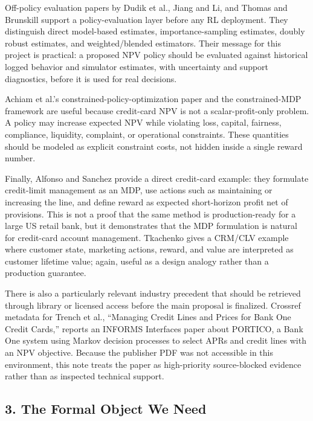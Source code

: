 \documentclass[
]{article}
\begin{document}
Off-policy evaluation papers by Dudik et al., Jiang and Li, and Thomas
and Brunskill support a policy-evaluation layer before any RL
deployment. They distinguish direct model-based estimates,
importance-sampling estimates, doubly robust estimates, and
weighted/blended estimators. Their message for this project is
practical: a proposed NPV policy should be evaluated against historical
logged behavior and simulator estimates, with uncertainty and support
diagnostics, before it is used for real decisions.

Achiam et al.'s constrained-policy-optimization paper and the
constrained-MDP framework are useful because credit-card NPV is not a
scalar-profit-only problem. A policy may increase expected NPV while
violating loss, capital, fairness, compliance, liquidity, complaint, or
operational constraints. These quantities should be modeled as explicit
constraint costs, not hidden inside a single reward number.

Finally, Alfonso and Sanchez provide a direct credit-card example: they
formulate credit-limit management as an MDP, use actions such as
maintaining or increasing the line, and define reward as expected
short-horizon profit net of provisions. This is not a proof that the
same method is production-ready for a large US retail bank, but it
demonstrates that the MDP formulation is natural for credit-card account
management. Tkachenko gives a CRM/CLV example where customer state,
marketing actions, reward, and value are interpreted as customer
lifetime value; again, useful as a design analogy rather than a
production guarantee.

There is also a particularly relevant industry precedent that should be
retrieved through library or licensed access before the main proposal is
finalized. Crossref metadata for Trench et al., ``Managing Credit Lines
and Prices for Bank One Credit Cards,'' reports an INFORMS Interfaces
paper about PORTICO, a Bank One system using Markov decision processes
to select APRs and credit lines with an NPV objective. Because the
publisher PDF was not accessible in this environment, this note treats
the paper as high-priority source-blocked evidence rather than as
inspected technical support.

\hypertarget{the-formal-object-we-need}{%
\subsection{3. The Formal Object We
Need}\label{the-formal-object-we-need}}
\end{document}
